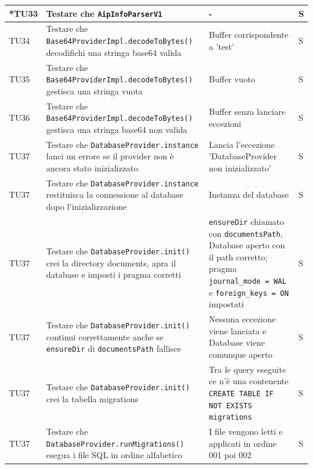 \documentclass[a4paper,12pt]{article}
\begin{document}
\begin{longtable}{|M{1.2cm}|M{5cm}|M{5cm}|M{1.5cm}|}

            *TU33 & Testare che \texttt{AipInfoParserV1} & - & S \\
            \hline

            TU34 & Testare che \texttt{Base64ProviderImpl.decodeToBytes()} decodifichi una stringa base64 valida & Buffer corrispondente a 'test' & S \\
            \hline

            TU35 & Testare che \texttt{Base64ProviderImpl.decodeToBytes()} gestisca una stringa vuota & Buffer vuoto & S \\
            \hline

            TU36 & Testare che \texttt{Base64ProviderImpl.decodeToBytes()} gestisca una stringa base64 non valida & Buffer senza lanciare eccezioni & S \\
            \hline

            TU37 & Testare che \texttt{DatabaseProvider.instance} lanci un errore se il provider non è ancora stato inizializzato & Lancia l'eccezione 'DatabaseProvider non inizializzato' & S \\
            \hline

            TU37 & Testare che \texttt{DatabaseProvider.instance} restituisca la connessione al database dopo l'inizializzazione & Instanza del database & S \\
            \hline

            TU37 & Testare che \texttt{DatabaseProvider.init()} crei la directory documents, apra il database e imposti i pragma corretti & \texttt{ensureDir} chiamato con \texttt{documentsPath}, Database aperto con il path corretto; pragma \texttt{journal_mode = WAL} e \texttt{foreign_keys = ON} impostati & S \\
            \hline

            TU37 & Testare che \texttt{DatabaseProvider.init()} continui correttamente anche se \texttt{ensureDir} di \texttt{documentsPath} fallisce & Nessuna eccezione viene lanciata e Database viene comunque aperto & S \\
            \hline

            TU37 & Testare che \texttt{DatabaseProvider.init()} crei la tabella migrations & Tra le query eseguite ce n'è una contenente \texttt{CREATE TABLE IF NOT EXISTS migrations} & S \\
            \hline

            TU37 & Testare che \texttt{DatabaseProvider.runMigrations()} esegua i file SQL in ordine alfabetico & I file vengono letti e applicati in ordine 001 poi 002 & S \\
            \hline


\end{longtable}
\end{document}
